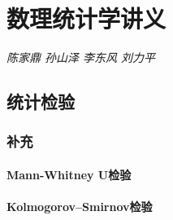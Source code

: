 
\chapter{数理统计学讲义}

\par \emph{陈家鼎 孙山泽 李东风 刘力平} \normalsize

\section{统计检验}

\subsection{补充}

\subsubsection{Mann-Whitney U检验}

\subsubsection{Kolmogorov–Smirnov检验}